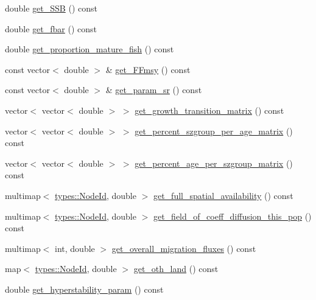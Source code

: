 \begin{DoxyCompactItemize}
double \mbox{\hyperlink{class_population_a8d5f00e07f966275471f0326dd05ca76}{get\+\_\+\+S\+SB}} () const
\item 
double \mbox{\hyperlink{class_population_a22059e8a5b9aafc8d20b4e1b79a9ea66}{get\+\_\+fbar}} () const
\item 
double \mbox{\hyperlink{class_population_a0425f54c30084fdc60e2824c3bc185e7}{get\+\_\+proportion\+\_\+mature\+\_\+fish}} () const
\item 
const vector$<$ double $>$ \& \mbox{\hyperlink{class_population_a5796212d35e49684c3a9f8ae230e881d}{get\+\_\+\+F\+Fmsy}} () const
\item 
const vector$<$ double $>$ \& \mbox{\hyperlink{class_population_a2c670f47448dd0614a2f8b1fce052f99}{get\+\_\+param\+\_\+sr}} () const
\item 
vector$<$ vector$<$ double $>$ $>$ \mbox{\hyperlink{class_population_afbc52323c78ba9532bb469a244c04f62}{get\+\_\+growth\+\_\+transition\+\_\+matrix}} () const
\item 
vector$<$ vector$<$ double $>$ $>$ \mbox{\hyperlink{class_population_ae049b91e1359f11caf562a4ccc4dd772}{get\+\_\+percent\+\_\+szgroup\+\_\+per\+\_\+age\+\_\+matrix}} () const
\item 
vector$<$ vector$<$ double $>$ $>$ \mbox{\hyperlink{class_population_a65d1bb492f962ad54e890c7f7e43a561}{get\+\_\+percent\+\_\+age\+\_\+per\+\_\+szgroup\+\_\+matrix}} () const
\item 
multimap$<$ \mbox{\hyperlink{classtypes_1_1_node_id}{types\+::\+Node\+Id}}, double $>$ \mbox{\hyperlink{class_population_a9d785272507fa047776832df0e78199a}{get\+\_\+full\+\_\+spatial\+\_\+availability}} () const
\item 
multimap$<$ \mbox{\hyperlink{classtypes_1_1_node_id}{types\+::\+Node\+Id}}, double $>$ \mbox{\hyperlink{class_population_ac19b4f16a221c1a72c18f34ffa5a4b45}{get\+\_\+field\+\_\+of\+\_\+coeff\+\_\+diffusion\+\_\+this\+\_\+pop}} () const
\item 
multimap$<$ int, double $>$ \mbox{\hyperlink{class_population_ae73e867311e89c73428bddc207c8814f}{get\+\_\+overall\+\_\+migration\+\_\+fluxes}} () const
\item 
map$<$ \mbox{\hyperlink{classtypes_1_1_node_id}{types\+::\+Node\+Id}}, double $>$ \mbox{\hyperlink{class_population_a93b6a5ebf600f94d89ea891af150d2ba}{get\+\_\+oth\+\_\+land}} () const
\item 
double \mbox{\hyperlink{class_population_a67bfacbeaf03d738b523b07a380bbdf6}{get\+\_\+hyperstability\+\_\+param}} () const
\item 

\end{DoxyCompactItemize}

